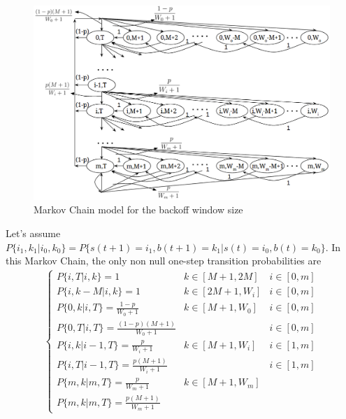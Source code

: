 \documentclass[journal]{IEEEtran}
\begin{document}
\begin{figure}[!t]
\includegraphics[scale=.45]{./figure/Markov_chain.png}
\caption{Markov Chain model for the backoff window size}
\label{Markov}
\end{figure}

Let's assume $P\lbrace i_1, k_1|i_0,k_0\rbrace = P\lbrace s(t+1) = i_1, b(t+1)= k_1|s(t) = i_0, b(t) = k_0\rbrace $. In this Markov Chain, the only non null one-step transition probabilities are 
\begin{align}
\left\lbrace
\begin{array}{lll}
P\lbrace i, T | i, k \rbrace = 1  						& k\in [M+1,2M]			& i \in [0,m]\\ [3pt]
P\lbrace i, k-M | i, k \rbrace = 1  					& k\in [2M+1,W_i]   	& i \in [0,m]\\ [3pt]
P\lbrace 0, k | i, T \rbrace = \frac{1-p}{W_0+1}  		& k\in [M+1,W_0]		& i \in [0,m]\\ [3pt]
P\lbrace 0, T | i, T \rbrace = \frac{(1-p)(M+1)}{W_0+1} &						& i \in [0,m]\\ [3pt]
P\lbrace i, k | i-1, T \rbrace = \frac{p}{W_i+1} 		& k\in [M+1,W_i] 		& i \in [1,m]\\ [3pt]
P\lbrace i, T | i-1, T \rbrace = \frac{p(M+1)}{W_i+1}   &	  					& i \in [1,m]\\ [3pt]
P\lbrace m, k | m, T \rbrace = \frac{p}{W_m+1} 		 	& k\in [M+1,W_m] 		& \\ [3pt]
P\lbrace m, k | m, T \rbrace = \frac{p(M+1)}{W_m+1}
\end{array}
\right.
\label{trans_prob}
\end{align}
\end{document}
